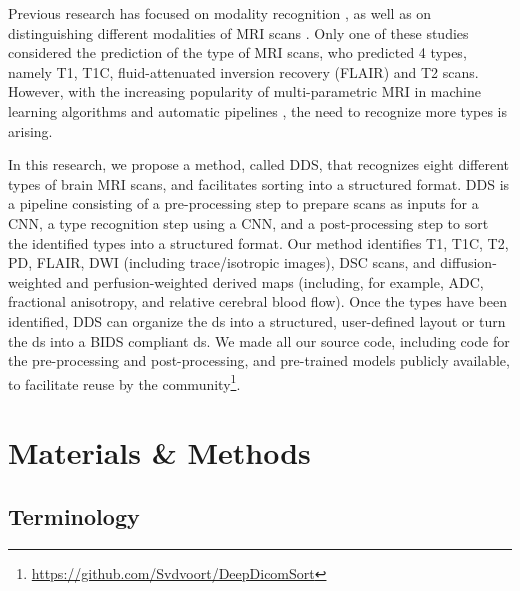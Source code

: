 Previous research has focused on modality recognition \autocite{dimitrovski2015improved,yu2015modality,arias2016medical}, as well as on distinguishing different modalities of \gls{MRI} \glspl{scan} \autocite{srinivas2014medical,remedios2018classifying}.
Only one of these studies \autocite{remedios2018classifying} considered the prediction of the \gls{type} of \gls{MRI} \glspl{scan}, who predicted 4 \glspl{type}, namely \gls{T1}, \gls{T1C}, fluid-attenuated inversion recovery (FLAIR) and \gls{T2} \glspl{scan}.
However, with the increasing popularity of multi-parametric \gls{MRI} in machine learning algorithms and automatic pipelines \autocite{li2017deep,akkus2017predicting,nie20163d,pereira2015deep}, the need to recognize more \glspl{type} is arising.

In this research, we propose a method, called \gls{DDS}, that recognizes eight different \glspl{type} of brain \gls{MRI} \glspl{scan}, and facilitates sorting into a structured format.
\gls{DDS} is a pipeline consisting of a pre-processing step to prepare \glspl{scan} as inputs for a \gls{CNN}, a \gls{type} recognition step using a \gls{CNN}, and a post-processing step to sort the identified \glspl{type} into a structured format.
Our method identifies \gls{T1}, \gls{T1C}, \gls{T2}, \gls{PD}, \gls{FLAIR}, \gls{DWI} (including trace/isotropic images), \gls{DSC} \glspl{scan}, and diffusion-weighted and perfusion-weighted derived maps (including, for example, \gls{ADC}, fractional anisotropy, and relative cerebral blood flow).
Once the \glspl{type} have been identified, \gls{DDS} can organize the \gls{ds} into a structured, user-defined layout or turn the \gls{ds} into a \gls{BIDS} compliant \gls{ds}.
We made all our source code, including code for the pre-processing and post-processing, and pre-trained models publicly available, to facilitate reuse by the community\footnote{\url{https://github.com/Svdvoort/DeepDicomSort}}.


\section{Materials \& Methods}
\subsection{Terminology}

